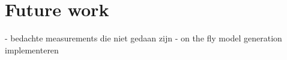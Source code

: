 \section{Future work}
- bedachte measurements die niet gedaan zijn
- on the fly model generation implementeren
